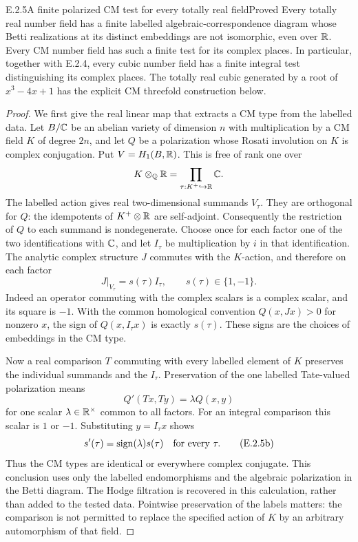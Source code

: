 \begin{result}{E.2.5}{A finite polarized CM test for every totally real field}{Proved}
Every totally real number field has a finite labelled algebraic-correspondence diagram whose Betti realizations at its distinct embeddings are not isomorphic, even over $\mathbb R$. Every CM number field has such a finite test for its complex places. In particular, together with E.2.4, every cubic number field has a finite integral test distinguishing its complex places. The totally real cubic generated by a root of $x^3-4x+1$ has the explicit CM threefold construction below.
\end{result}
\begin{proof}
We first give the real linear map that extracts a CM type from the labelled data. Let $B/\mathbb C$ be an abelian variety of dimension $n$ with multiplication by a CM field $K$ of degree $2n$, and let $Q$ be a polarization whose Rosati involution on $K$ is complex conjugation. Put $V=H_1(B,\mathbb R)$. This is free of rank one over
\[
 K\otimes_\mathbb Q\mathbb R=\prod_{\tau:K^+\hookrightarrow\mathbb R}\mathbb C.
\]
The labelled action gives real two-dimensional summands $V_\tau$. They are orthogonal for $Q$: the idempotents of $K^+\otimes\mathbb R$ are self-adjoint. Consequently the restriction of $Q$ to each summand is nondegenerate. Choose once for each factor one of the two identifications with $\mathbb C$, and let $I_\tau$ be multiplication by $i$ in that identification. The analytic complex structure $J$ commutes with the $K$-action, and therefore on each factor
\[
 J|_{V_\tau}=s(\tau)I_\tau,\qquad s(\tau)\in\{1,-1\}.
 \tag{E.2.5a}
\]
Indeed an operator commuting with the complex scalars is a complex scalar, and its square is $-1$. With the common homological convention $Q(x,Jx)>0$ for nonzero $x$, the sign of $Q(x,I_\tau x)$ is exactly $s(\tau)$. These signs are the choices of embeddings in the CM type.

Now a real comparison $T$ commuting with every labelled element of $K$ preserves the individual summands and the $I_\tau$. Preservation of the one labelled Tate-valued polarization means
\[
 Q'(Tx,Ty)=\lambda Q(x,y)
\]
for one scalar $\lambda\in\mathbb R^\times$ common to all factors. For an integral comparison this scalar is $1$ or $-1$. Substituting $y=I_\tau x$ shows
\[
 s'(\tau)=\operatorname{sign}(\lambda)s(\tau)
              \quad\hbox{for every }\tau.
 \tag{E.2.5b}
\]
Thus the CM types are identical or everywhere complex conjugate. This conclusion uses only the labelled endomorphisms and the algebraic polarization in the Betti diagram. The Hodge filtration is recovered in this calculation, rather than added to the tested data. Pointwise preservation of the labels matters: the comparison is not permitted to replace the specified action of $K$ by an arbitrary automorphism of that field.


\end{proof}
